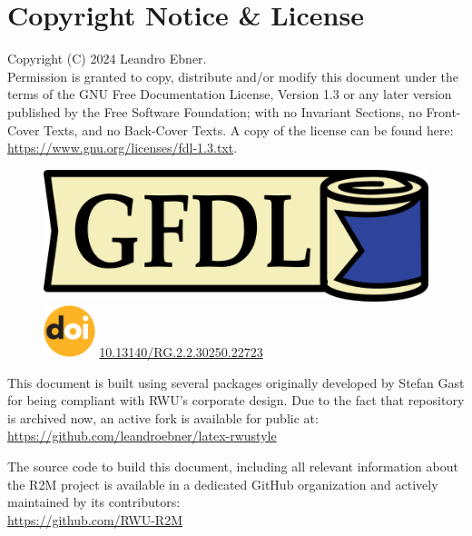 \section{Copyright Notice \& License}

    Copyright (C)  2024 Leandro Ebner. \\
    Permission is granted to copy, distribute and/or modify this document under the terms of the GNU Free Documentation License, Version 1.3 or any later version published by the Free Software Foundation; with no Invariant Sections, no Front-Cover Texts, and no Back-Cover Texts. A copy of the license can be found here:
    \href{https://www.gnu.org/licenses/fdl-1.3.txt}{https://www.gnu.org/licenses/fdl-1.3.txt}.

    \begin{figure}[h!] %
        \includegraphics{contents/figures/gfdl-logo.png}
        \hspace{5mm} %
        \includegraphics[width=1.5cm]{contents/figures/DOI_logo.png}
        \href{http://dx.doi.org/10.13140/RG.2.2.30250.22723}{10.13140/RG.2.2.30250.22723}
    \end{figure}

    \vspace{5mm} %
    
    This document is built using several packages originally developed by Stefan Gast for being compliant with RWU's corporate design. Due to the fact that repository is archived now, an active fork is available for public at: \\
    \href{https://github.com/leandroebner/latex-rwustyle}{https://github.com/leandroebner/latex-rwustyle} 

    The source code to build this document, including all relevant information about the R2M project is available in a dedicated GitHub organization and actively maintained by its contributors: \\
    \href{https://github.com/RWU-R2M}{https://github.com/RWU-R2M}
    
